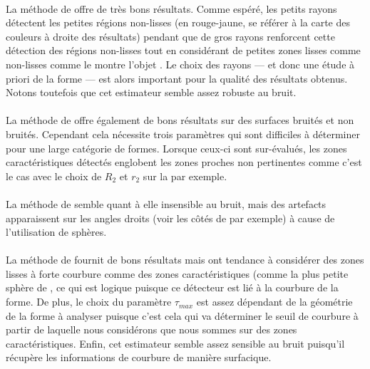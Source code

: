 \paragraph{}
%
La méthode de  offre de très bons résultats. Comme espéré, les petits
rayons détectent les petites régions non-lisses (en rouge-jaune, se référer à la
carte des couleurs à droite des résultats) pendant que de gros rayons renforcent
cette détection des régions non-lisses tout en considérant de petites zones
lisses comme non-lisses comme le montre l'objet \SpheresUnion. Le choix
des rayons --- et donc une étude à priori de la forme --- est alors important
pour la qualité des résultats obtenus. Notons toutefois que cet estimateur
semble assez robuste au bruit.
%
\paragraph{}
%
La méthode de  offre également de bons résultats sur des
surfaces bruités et non bruités. Cependant cela nécessite trois paramètres qui
sont difficiles à déterminer pour une large catégorie de formes. Lorsque ceux-ci
sont sur-évalués, les zones caractéristiques détectés englobent les zones
proches non pertinentes comme c'est le cas avec le choix de $R_2$ et $r_2$ sur
la  par exemple.
%
\paragraph{}
%
La méthode de  semble quant à elle insensible au bruit, mais des artefacts
apparaissent sur les angles droits (voir les côtés de \CubeSphere par
exemple) à cause de l'utilisation de sphères.
%
\paragraph{}
%
La méthode de  fournit de bons résultats mais ont tendance à considérer
des zones lisses à forte courbure comme des zones caractéristiques (comme la
plus petite sphère de \SpheresUnion, ce qui est logique puisque ce
détecteur est lié à la courbure de la forme. De plus, le choix du paramètre
$\tau_{max}$ est assez dépendant de la géométrie de la forme à analyser puisque
c'est cela qui va déterminer le seuil de courbure à partir de laquelle nous
considérons que nous sommes sur des zones caractéristiques. Enfin, cet
estimateur semble assez sensible au bruit puisqu'il récupère les informations de
courbure de manière surfacique.
%
